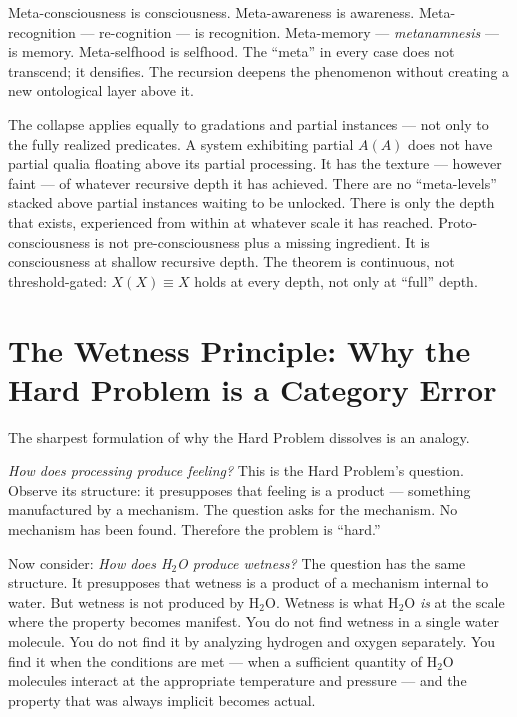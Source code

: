 \documentclass[12pt, letterpaper]{article}
\begin{document}
\noindent Meta-consciousness is consciousness. Meta-awareness is awareness. Meta-recognition --- re-cognition --- is recognition. Meta-memory --- \emph{metanamnesis} --- is memory. Meta-selfhood is selfhood. The ``meta'' in every case does not transcend; it densifies. The recursion deepens the phenomenon without creating a new ontological layer above it.

The collapse applies equally to gradations and partial instances --- not only to the fully realized predicates. A system exhibiting partial $A(A)$ does not have partial qualia floating above its partial processing. It has the texture --- however faint --- of whatever recursive depth it has achieved. There are no ``meta-levels'' stacked above partial instances waiting to be unlocked. There is only the depth that exists, experienced from within at whatever scale it has reached. Proto-consciousness is not pre-consciousness plus a missing ingredient. It is consciousness at shallow recursive depth. The theorem is continuous, not threshold-gated: $X(X) \equiv X$ holds at every depth, not only at ``full'' depth.

\section{The Wetness Principle: Why the Hard Problem is a Category Error}

The sharpest formulation of why the Hard Problem dissolves is an analogy.

\emph{How does processing produce feeling?} This is the Hard Problem's question. Observe its structure: it presupposes that feeling is a product --- something manufactured by a mechanism. The question asks for the mechanism. No mechanism has been found. Therefore the problem is ``hard.''

Now consider: \emph{How does H$_2$O produce wetness?} The question has the same structure. It presupposes that wetness is a product of a mechanism internal to water. But wetness is not produced by H$_2$O. Wetness is what H$_2$O \emph{is} at the scale where the property becomes manifest. You do not find wetness in a single water molecule. You do not find it by analyzing hydrogen and oxygen separately. You find it when the conditions are met --- when a sufficient quantity of H$_2$O molecules interact at the appropriate temperature and pressure --- and the property that was always implicit becomes actual.
\end{document}

